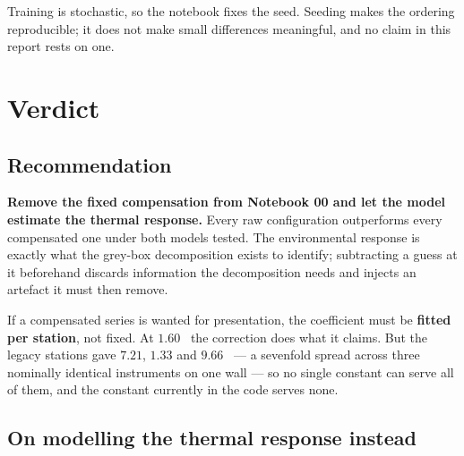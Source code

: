 \documentclass[11pt,a4paper]{article}
\begin{document}
Training is stochastic, so the notebook fixes the seed. Seeding makes the ordering
reproducible; it does not make small differences meaningful, and no claim in this report
rests on one.

\section{Verdict}


\subsection{Recommendation}

\textbf{Remove the fixed compensation from Notebook 00 and let the model estimate the
thermal response.} Every raw configuration outperforms every compensated one under both
models tested. The environmental response is exactly what the grey-box decomposition
exists to identify; subtracting a guess at it beforehand discards information the
decomposition needs and injects an artefact it must then remove.

If a compensated series is wanted for presentation, the coefficient must be
\textbf{fitted per station}, not fixed. At $1.60$ \mdegC\ the correction does what it
claims. But the legacy stations gave $7.21$, $1.33$ and $9.66$ \mdegC\ --- a sevenfold
spread across three nominally identical instruments on one wall --- so no single
constant can serve all of them, and the constant currently in the code serves none.

\subsection{On modelling the thermal response instead}
\end{document}
